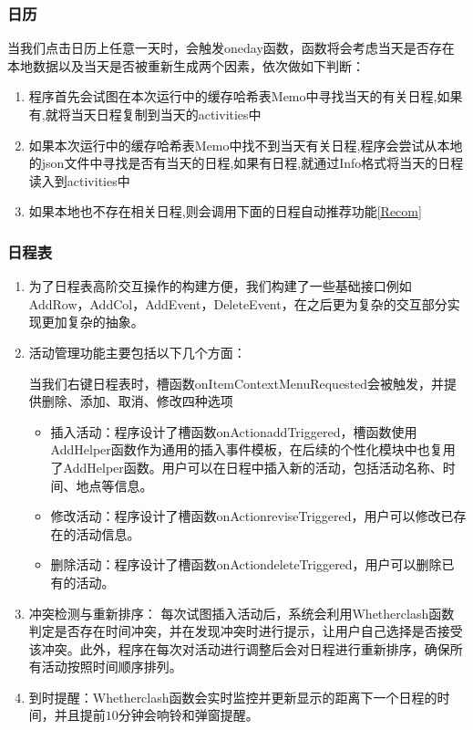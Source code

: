 \documentclass[11pt,hyperref,a4paper,UTF8]{ctexart}
\begin{document}
\begin{CJK}{UTF8}{gkai}
\subsubsection{日历}
当我们点击日历上任意一天时，会触发oneday函数，函数将会考虑当天是否存在本地数据以及当天是否被重新生成两个因素，依次做如下判断：
\begin{enumerate}
    \item 程序首先会试图在本次运行中的缓存哈希表Memo中寻找当天的有关日程,如果有,就将当天日程复制到当天的activities中
    \item 如果本次运行中的缓存哈希表Memo中找不到当天有关日程,程序会尝试从本地的json文件中寻找是否有当天的日程,如果有日程,就通过Info格式将当天的日程读入到activities中
    \item 如果本地也不存在相关日程,则会调用下面的日程自动推荐功能\ref{Recom}
\end{enumerate}

\subsubsection{日程表}
\begin{enumerate}
    \item 为了日程表高阶交互操作的构建方便，我们构建了一些基础接口例如AddRow，AddCol，AddEvent，DeleteEvent，在之后更为复杂的交互部分实现更加复杂的抽象。
    \item 活动管理功能主要包括以下几个方面：

    当我们右键日程表时，槽函数onItemContextMenuRequested会被触发，并提供删除、添加、取消、修改四种选项
    \begin{itemize}
        \item 插入活动：程序设计了槽函数onActionaddTriggered，槽函数使用AddHelper函数作为通用的插入事件模板，在后续的个性化模块中也复用了AddHelper函数。用户可以在日程中插入新的活动，包括活动名称、时间、地点等信息。
        \item 修改活动：程序设计了槽函数onActionreviseTriggered，用户可以修改已存在的活动信息。
        \item 删除活动：程序设计了槽函数onActiondeleteTriggered，用户可以删除已有的活动。
    \end{itemize}
    \item 冲突检测与重新排序： 每次试图插入活动后，系统会利用Whetherclash函数判定是否存在时间冲突，并在发现冲突时进行提示，让用户自己选择是否接受该冲突。此外，程序在每次对活动进行调整后会对日程进行重新排序，确保所有活动按照时间顺序排列。
    \item 到时提醒：Whetherclash函数会实时监控并更新显示的距离下一个日程的时间，并且提前$10$分钟会响铃和弹窗提醒。
\end{enumerate}


\end{CJK}
\end{document}
